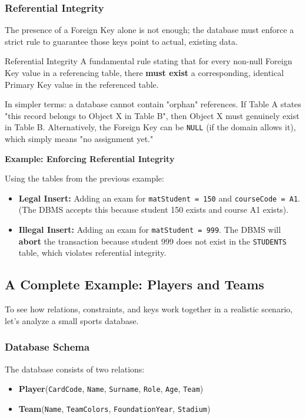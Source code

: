 \subsubsection{Referential Integrity}
The presence of a Foreign Key alone is not enough; the database must enforce a strict rule to guarantee those keys point to actual, existing data.

\begin{defbox}{Referential Integrity}
A fundamental rule stating that for every non-null Foreign Key value in a referencing table, there \textbf{must exist} a corresponding, identical Primary Key value in the referenced table.
\end{defbox}

In simpler terms: a database cannot contain "orphan" references. If Table A states "this record belongs to Object X in Table B", then Object X must genuinely exist in Table B. Alternatively, the Foreign Key can be \texttt{NULL} (if the domain allows it), which simply means "no assignment yet."

\vspace{0.2cm}
\begin{example}{\textbf{Example: Enforcing Referential Integrity}}

Using the tables from the previous example:
\begin{itemize}
    \item \textbf{Legal Insert:} Adding an exam for \texttt{matStudent = 150} and \texttt{courseCode = A1}. (The DBMS accepts this because student 150 exists and course A1 exists).
    \item \textbf{Illegal Insert:} Adding an exam for \texttt{matStudent = 999}. The DBMS will \textbf{abort} the transaction because student 999 does not exist in the \texttt{STUDENTS} table, which violates referential integrity.
\end{itemize}
\end{example}


\subsection{A Complete Example: Players and Teams}
To see how relations, constraints, and keys work together in a realistic scenario, let's analyze a small sports database.

\subsubsection{Database Schema}
The database consists of two relations:
\begin{itemize}
    \item \textbf{Player}(\texttt{CardCode}, \texttt{Name}, \texttt{Surname}, \texttt{Role}, \texttt{Age}, \texttt{Team})
    \item \textbf{Team}(\texttt{Name}, \texttt{TeamColors}, \texttt{FoundationYear}, \texttt{Stadium})
\end{itemize}

